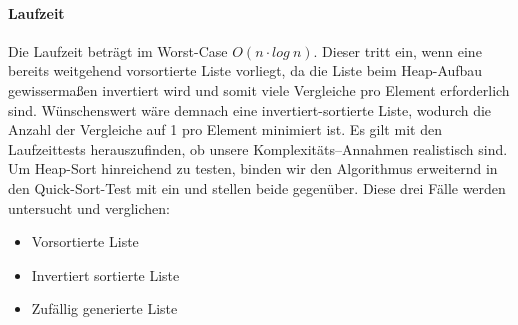 \paragraph{Laufzeit}\label{subsec:Hlaufzeit}
Die Laufzeit beträgt im Worst-Case \(O(n\cdot log\ n)\). Dieser tritt
ein, wenn eine bereits weitgehend vorsortierte Liste vorliegt, da die
Liste beim Heap-Aufbau gewissermaßen invertiert wird und somit viele
Vergleiche pro Element erforderlich sind.
Wünschenswert wäre demnach eine invertiert-sortierte Liste, wodurch die
Anzahl der Vergleiche auf 1 pro Element minimiert ist.
Es gilt mit den Laufzeittests herauszufinden, ob unsere
Komplexitäts--Annahmen realistisch sind.
Um Heap-Sort hinreichend zu testen, binden wir den Algorithmus erweiternd
in den Quick-Sort-Test mit ein und stellen beide gegenüber.
Diese drei Fälle werden untersucht und verglichen:
\begin{samepage}
    \begin{itemize}
        \item Vorsortierte Liste
        \item Invertiert sortierte Liste
        \item Zufällig generierte Liste
    \end{itemize}
\end{samepage}
\FloatBarrier

